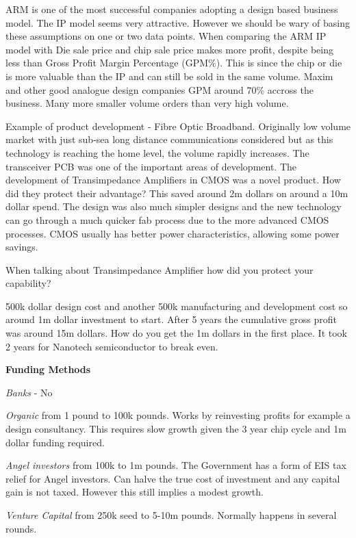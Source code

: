 ARM is one of the most successful companies adopting a design based business model. 
The IP model seems very attractive. However we should be wary of basing these assumptions on one or two data points. 
When comparing the ARM IP model with Die sale price and chip sale price makes more profit, despite being less than Gross Profit Margin Percentage (GPM\%). 
This is since the chip or die is more valuable than the IP and can still be sold in the same volume. Maxim and other good analogue design companies GPM around 70\% accross the business. 
Many more smaller volume orders than very high volume.

Example of product development - Fibre Optic Broadband.
 Originally low volume market with just sub-sea long distance communications considered but as this technology is reaching the home level, the volume rapidly increases. 
The transceiver PCB was one of the important areas of development. 
The development of Transimpedance Amplifiers in CMOS was a novel product. 
How did they protect their advantage? This saved around 2m dollars on around a 10m dollar spend. 
The design was also much simpler designs and the new technology can go through a much quicker fab process due to the more advanced CMOS processes. 
CMOS usually has better power characteristics, allowing some power savings.

When talking about Transimpedance Amplifier how did you protect your capability?

500k dollar design cost and another 500k manufacturing and development cost so around 1m dollar investment to start. 
After 5 years the cumulative gross profit was around 15m dollars.
 How do you get the 1m dollars in the first place. 
It took 2 years for Nanotech semiconductor to break even.

\textbf{Funding Methods}

\textit{Banks} - No

\textit{Organic} from 1 pound to 100k pounds. Works by reinvesting profits for example a design consultancy. This requires slow growth given the 3 year chip cycle and 1m dollar funding required.

\textit{Angel investors} from 100k to 1m pounds. The Government has a form of EIS tax relief for Angel investors. Can halve the true cost of investment and any capital gain is not taxed. However  this still implies a modest growth.

\textit{Venture Capital} from 250k seed to 5-10m pounds. Normally happens in several rounds.

